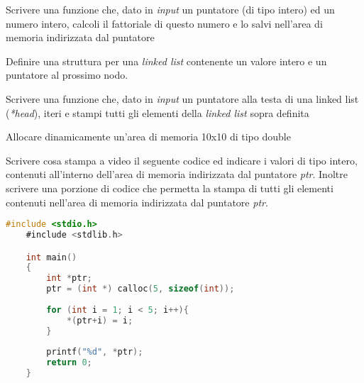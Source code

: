 \documentclass[addpoints,11pt]{exam}
\begin{document}
\begin{questions}



\question [1]
Scrivere una funzione che, dato in \emph{input} un puntatore (di tipo intero) ed un numero intero, calcoli il fattoriale di questo numero e lo salvi nell'area di memoria indirizzata dal puntatore
\makeemptybox{150pt}



\question[1] 
Definire una struttura per una \emph{linked list} contenente un valore intero e un puntatore al prossimo nodo.
\makeemptybox{100pt}



\question[2] 
Scrivere una funzione che, dato in \emph{input} un puntatore alla testa di una linked list (\emph{*head}), iteri e stampi tutti gli elementi della \emph{linked list} sopra definita
\makeemptybox{120pt}



\question[2]
Allocare dinamicamente un'area di memoria 10x10 di tipo double

\makeemptybox{100pt}



\question[2]
Scrivere cosa stampa a video il seguente codice ed indicare i valori di tipo intero, contenuti all'interno dell'area di memoria indirizzata dal puntatore \emph{ptr}. Inoltre scrivere una porzione di codice che permetta la stampa di tutti gli elementi contenuti nell'area di memoria indirizzata dal puntatore \emph{ptr}.

\begin{minipage}[t]{0.5\linewidth}
	\begin{lstlisting}[language=C]
	#include <stdio.h>
	#include <stdlib.h>

	int main()
	{
		int *ptr;
		ptr = (int *) calloc(5, sizeof(int));
		
		for (int i = 1; i < 5; i++){
			*(ptr+i) = i;
		}
		
		printf("%d", *ptr);
		return 0;
	}
	\end{lstlisting}
\end{minipage}
\begin{minipage}[t]{0.5\linewidth}
	\makeemptybox{150pt}
\end{minipage}




\end{questions}
\end{document}
